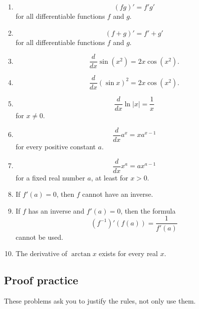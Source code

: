 \begin{enumerate}
\item
\[
(fg)'=f'g'
\]
for all differentiable functions \(f\) and \(g\).

\item
\[
(f+g)'=f'+g'
\]
for all differentiable functions \(f\) and \(g\).

\item
\[
\frac{d}{dx}\sin(x^2)=2x\cos(x^2).
\]

\item
\[
\frac{d}{dx}(\sin x)^2=2x\cos(x^2).
\]

\item
\[
\frac{d}{dx}\ln|x|=\frac1x
\]
for \(x\neq0\).

\item
\[
\frac{d}{dx}a^x=xa^{x-1}
\]
for every positive constant \(a\).

\item
\[
\frac{d}{dx}x^a=ax^{a-1}
\]
for a fixed real number \(a\), at least for \(x>0\).

\item If \(f'(a)=0\), then \(f\) cannot have an inverse.

\item If \(f\) has an inverse and \(f'(a)=0\), then the formula
\[
(f^{-1})'(f(a))=\frac1{f'(a)}
\]
cannot be used.

\item The derivative of \(\arctan x\) exists for every real \(x\).
\end{enumerate}

\subsection{Proof practice}
\label{subsec:chapter-5-proof-practice}

These problems ask you to justify the rules, not only use them.

